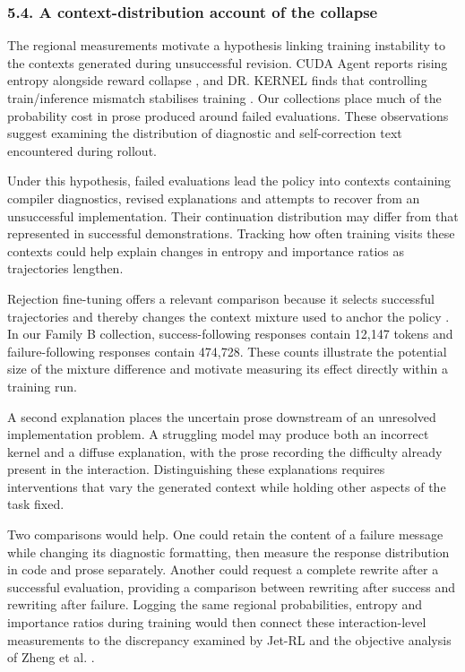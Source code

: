 \documentclass[
  11pt,
]{article}
\begin{document}
\hypertarget{a-context-distribution-account-of-the-collapse}{%
\subsubsection{5.4. A context-distribution account of the
collapse}\label{a-context-distribution-account-of-the-collapse}}

The regional measurements motivate a hypothesis linking training
instability to the contexts generated during unsuccessful revision. CUDA
Agent reports rising entropy alongside reward collapse
\citep{cudaagent}, and DR. KERNEL finds that controlling train/inference
mismatch stabilises training \citep{drkernel}. Our collections place
much of the probability cost in prose produced around failed
evaluations. These observations suggest examining the distribution of
diagnostic and self-correction text encountered during rollout.

Under this hypothesis, failed evaluations lead the policy into contexts
containing compiler diagnostics, revised explanations and attempts to
recover from an unsuccessful implementation. Their continuation
distribution may differ from that represented in successful
demonstrations. Tracking how often training visits these contexts could
help explain changes in entropy and importance ratios as trajectories
lengthen.

Rejection fine-tuning offers a relevant comparison because it selects
successful trajectories and thereby changes the context mixture used to
anchor the policy \citep{cudaagent}. In our Family B collection,
success-following responses contain 12,147 tokens and failure-following
responses contain 474,728. These counts illustrate the potential size of
the mixture difference and motivate measuring its effect directly within
a training run.

A second explanation places the uncertain prose downstream of an
unresolved implementation problem. A struggling model may produce both
an incorrect kernel and a diffuse explanation, with the prose recording
the difficulty already present in the interaction. Distinguishing these
explanations requires interventions that vary the generated context
while holding other aspects of the task fixed.

Two comparisons would help. One could retain the content of a failure
message while changing its diagnostic formatting, then measure the
response distribution in code and prose separately. Another could
request a complete rewrite after a successful evaluation, providing a
comparison between rewriting after success and rewriting after failure.
Logging the same regional probabilities, entropy and importance ratios
during training would then connect these interaction-level measurements
to the discrepancy examined by Jet-RL and the objective analysis of
Zheng et al. \citep{jetrl, firstorder}.
\end{document}
